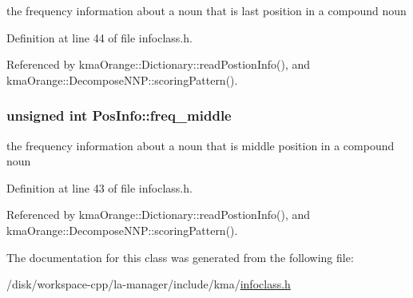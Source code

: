 the frequency information about a noun that is last position in a compound noun 



Definition at line 44 of file infoclass.h.

Referenced by kmaOrange::Dictionary::readPostionInfo(), and kmaOrange::DecomposeNNP::scoringPattern().\hypertarget{classPosInfo_b196ef658eb439010822780e260c6900}{
\subsubsection[{freq\_\-middle}]{\setlength{\rightskip}{0pt plus 5cm}unsigned int {\bf PosInfo::freq\_\-middle}}}
\label{classPosInfo_b196ef658eb439010822780e260c6900}


the frequency information about a noun that is middle position in a compound noun 



Definition at line 43 of file infoclass.h.

Referenced by kmaOrange::Dictionary::readPostionInfo(), and kmaOrange::DecomposeNNP::scoringPattern().

The documentation for this class was generated from the following file:\begin{CompactItemize}
\item 
/disk/workspace-cpp/la-manager/include/kma/\hyperlink{infoclass_8h}{infoclass.h}\end{CompactItemize}
